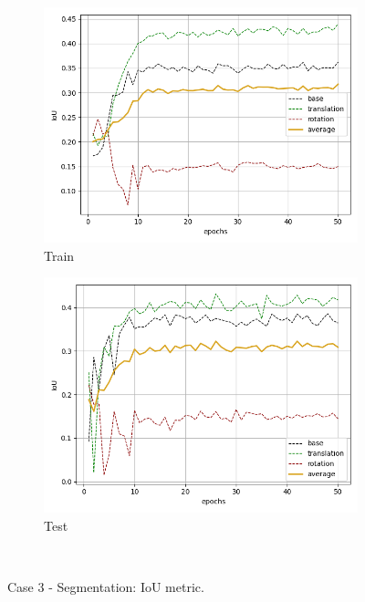 \begin{figure}[H]
    \begin{subfigure}{.48\linewidth}
    \centering
    \includegraphics[scale=0.45]{Img/seg_flow_nonoise_train_iou.png}
    \caption{Train}
    \end{subfigure}
    \begin{subfigure}{.48\linewidth}
    \centering
    \includegraphics[scale=0.45]{Img/seg_flow_nonoise_test_iou.png}
    \caption{Test}
    \end{subfigure}\\
    \caption{Case 3 - Segmentation: IoU metric.}
\end{figure}